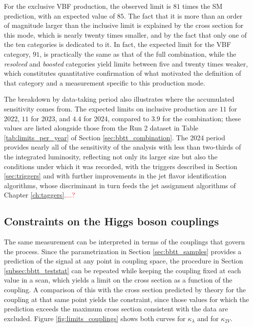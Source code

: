 
For the exclusive VBF production, the observed limit is $81$ times the SM prediction, with an expected value of $85$. The fact that it is more than an order of magnitude larger than the inclusive limit is explained by the cross section for this mode, which is nearly twenty times smaller, and by the fact that only one of the ten categories is dedicated to it. In fact, the expected limit for the VBF category, $91$, is practically the same as that of the full combination, while the \textit{resolved} and \textit{boosted} categories yield limits between five and twenty times weaker, which constitutes quantitative confirmation of what motivated the definition of that category and a measurement specific to this production mode.\medskip

The breakdown by data-taking period also illustrates where the accumulated sensitivity comes from. The expected limits on inclusive production are $11$ for 2022, $11$ for 2023, and $4.4$ for 2024, compared to $3.9$ for the combination; these values are listed alongside those from the Run 2 dataset in Table \ref{tab:limits_per_year} of Section \ref{sec:bbtt_combination}. The 2024 period provides nearly all of the sensitivity of the analysis with less than two-thirds of the integrated luminosity, reflecting not only its larger size but also the conditions under which it was recorded, with the triggers described in Section \ref{sec:triggers} and with further improvements in the jet flavor identification algorithms, whose discriminant in turn feeds the jet assignment algorithms of Chapter \ref{ch:taggers}.\textcolor{red}{...?}

\subsection{Constraints on the Higgs boson couplings}
\label{subsec:bbtt_couplings}
%
The same measurement can be interpreted in terms of the couplings that govern the process. Since the parametrization in Section \ref{sec:bbtt_samples} provides a prediction of the signal at any point in coupling space, the procedure in Section \ref{subsec:bbtt_teststat} can be repeated while keeping the coupling fixed at each value in a scan, which yields a limit on the cross section as a function of the coupling. A comparison of this with the cross section predicted by theory for the coupling at that same point yields the constraint, since those values for which the prediction exceeds the maximum cross section consistent with the data are excluded. Figure \ref{fig:limits_couplings} shows both curves for $\kappa_\lambda$ and for $\kappa_{2V}$.

